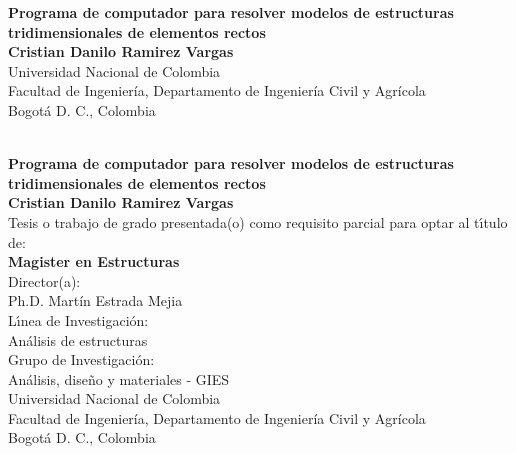 \begin{center}
\begin{figure}
\centering%
%
\end{figure}
\thispagestyle{empty} \vspace*{2.0cm} \textbf{\huge
Programa de computador para resolver modelos de estructuras tridimensionales de elementos rectos}\\[6.0cm]
\Large\textbf{Cristian Danilo Ramirez Vargas}\\[5.0cm]
\small Universidad Nacional de Colombia\\
Facultad de Ingeniería, Departamento de Ingeniería Civil y Agrícola\\
Bogotá D. C., Colombia\\
\the\year\\
\end{center}

\newpage{\pagestyle{empty}\cleardoublepage}

\newpage
\begin{center}
\thispagestyle{empty} \vspace*{0cm} \textbf{\huge
Programa de computador para resolver modelos de estructuras tridimensionales de elementos rectos}\\[2.0cm]
\Large\textbf{Cristian Danilo Ramirez Vargas}\\[3.0cm]
\small Tesis o trabajo de grado presentada(o) como requisito parcial para optar al
t\'{\i}tulo de:\\
\textbf{Magister en Estructuras}\\[2.5cm]
Director(a):\\
Ph.D. Martín Estrada Mejia\\[2.0cm]
L\'{\i}nea de Investigaci\'{o}n:\\
Análisis de estructuras\\
Grupo de Investigaci\'{o}n:\\
Análisis, diseño y materiales - GIES\\[2.5cm]
Universidad Nacional de Colombia\\
Facultad de Ingeniería, Departamento de Ingeniería Civil y Agrícola\\
Bogotá D. C., Colombia\\
\the\year\\
\end{center}

\newpage{\pagestyle{empty}\cleardoublepage}

